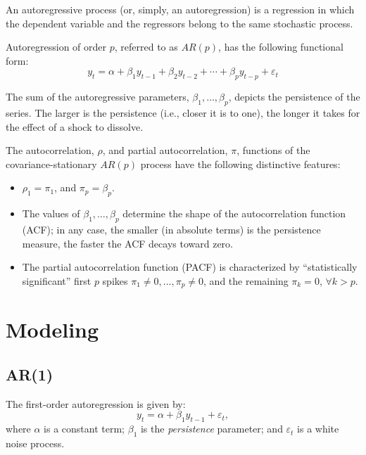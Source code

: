 \documentclass[
  oneside]{book}
\providecommand{\tightlist}{%
  \setlength{\itemsep}{0pt}\setlength{\parskip}{0pt}}
\begin{document}
An autoregressive process (or, simply, an autoregression) is a regression in which the dependent variable and the regressors belong to the same stochastic process.

Autoregression of order \(p\), referred to as \(AR(p)\), has the following functional form:
\[y_t = \alpha + \beta_1 y_{t-1}+\beta_2 y_{t-2}+ \cdots + \beta_p y_{t-p}+\varepsilon_t\]

The sum of the autoregressive parameters, \(\beta_1,\ldots,\beta_p\), depicts the persistence of the series. The larger is the persistence (i.e., closer it is to one), the longer it takes for the effect of a shock to dissolve.

The autocorrelation, \(\rho\), and partial autocorrelation, \(\pi\), functions of the covariance-stationary \(AR(p)\) process have the following distinctive features:

\begin{itemize}
\tightlist
\item
  \(\rho_1 = \pi_1\), and \(\pi_p = \beta_p\).
\item
  The values of \(\beta_1,\ldots,\beta_p\) determine the shape of the autocorrelation function (ACF); in any case, the smaller (in absolute terms) is the persistence measure, the faster the ACF decays toward zero.
\item
  The partial autocorrelation function (PACF) is characterized by ``statistically significant'' first \(p\) spikes \(\pi_1 \neq 0,\ldots,\pi_p \neq 0\), and the remaining \(\pi_k = 0\), \(\forall k > p\).
\end{itemize}

\hypertarget{modeling-2}{%
\section{Modeling}\label{modeling-2}}

\hypertarget{ar1}{%
\subsection{AR(1)}\label{ar1}}

The first-order autoregression is given by: \[y_t = \alpha + \beta_1 y_{t-1} + \varepsilon_t,\] where \(\alpha\) is a constant term; \(\beta_1\) is the \emph{persistence} parameter; and \(\varepsilon_t\) is a white noise process.
\end{document}
